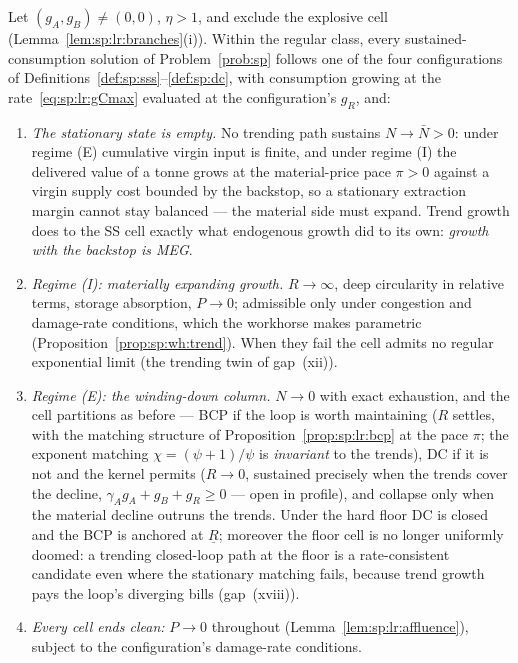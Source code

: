 \begin{proposition}\label{prop:sp:lr:trend}
Let $\left(g_A,g_B\right)\ne\left(0,0\right)$, $\eta>1$, and exclude the explosive cell
(Lemma~\ref{lem:sp:lr:branches}(i)). Within the regular class, every sustained-consumption
solution of Problem~\ref{prob:sp} follows one of the four configurations of
Definitions~\ref{def:sp:sss}--\ref{def:sp:dc}, with consumption growing at the
rate~\eqref{eq:sp:lr:gCmax} evaluated at the configuration's $g_R$, and:
\begin{enumerate}
    \item \emph{The stationary state is empty.} No trending path sustains $N\to\bar N>0$:
    under regime (E) cumulative virgin input is finite, and under regime (I) the delivered
    value of a tonne grows at the material-price pace $\pi>0$ against a virgin supply cost
    bounded by the backstop, so a stationary extraction margin cannot stay balanced --- the
    material side must expand. Trend growth does to the SS cell exactly what endogenous
    growth did to its own: \emph{growth with the backstop is MEG}.
    \item \emph{Regime (I): materially expanding growth.} $R\to\infty$, deep circularity in
    relative terms, storage absorption, $P\to0$; admissible only under congestion and
    damage-rate conditions, which the workhorse makes parametric
    (Proposition~\ref{prop:sp:wh:trend}). When they fail the cell admits no regular
    exponential limit (the trending twin of gap~(xii)).
    \item \emph{Regime (E): the winding-down column.} $N\to0$ with exact exhaustion, and the
    cell partitions as before --- BCP if the loop is worth maintaining ($R$ settles, with
    the matching structure of Proposition~\ref{prop:sp:lr:bcp} at the pace $\pi$; the
    exponent matching $\chi=\left(\psi+1\right)/\psi$ is \emph{invariant} to the trends),
    DC if it is not and the kernel permits ($R\to0$, sustained precisely when the trends
    cover the decline, $\gamma_Ag_A+g_B+g_R\ge0$ --- open in profile), and collapse only
    when the material decline outruns the trends. Under the hard floor DC is closed and the
    BCP is anchored at $\underline R$; moreover the floor cell is no longer uniformly
    doomed: a trending closed-loop path at the floor is a rate-consistent candidate even
    where the stationary matching fails, because trend growth pays the loop's diverging
    bills (gap~(xviii)).
    \item \emph{Every cell ends clean:} $P\to0$ throughout
    (Lemma~\ref{lem:sp:lr:affluence}), subject to the configuration's damage-rate
    conditions.
\end{enumerate}
\end{proposition}

